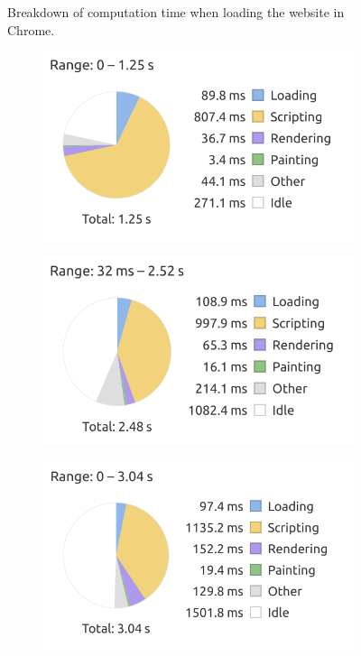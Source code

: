\documentclass[a4paper]{article}
\begin{document}
\begin{figure}[H]
    \caption{Breakdown of computation time when loading the website in Chrome.}
    \label{fig:hastings-performance}
\end{figure}


\begin{figure}[H]
    \centering
    \begin{subfigure}{0.32\textwidth}
        \includegraphics[width=\textwidth]{figure/clientsidePerformance/graph1.png}
    \end{subfigure}
    \begin{subfigure}{0.32\textwidth}
        \includegraphics[width=\textwidth]{figure/clientsidePerformance/braseegraph1.png}
    \end{subfigure}
    \begin{subfigure}{0.32\textwidth}
        \includegraphics[width=\textwidth]{figure/clientsidePerformance/ligraph1.png}

\end{subfigure}
\end{figure}
\end{document}
